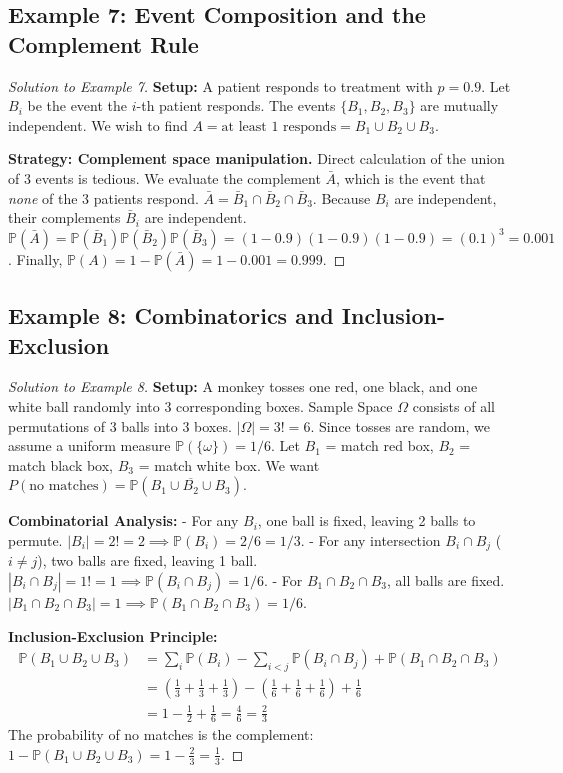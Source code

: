 \documentclass[12pt, a4paper]{article}
\theoremstyle{definition}
\theoremstyle{remark}
\newcommand{\Prob}{\mathbb{P}}
\newcommand{\W}{\Omega}
\newcommand{\1}{\mathbf{1}}
\begin{document}
\subsection*{Example 7: Event Composition and the Complement Rule}
\begin{proof}[Solution to Example 7]
\textbf{Setup:} A patient responds to treatment with $p=0.9$. Let $B_i$ be the event the $i$-th patient responds. The events $\{B_1, B_2, B_3\}$ are mutually independent. We wish to find $A = \text{at least 1 responds} = B_1 \cup B_2 \cup B_3$.

\textbf{Strategy: Complement space manipulation.} 
Direct calculation of the union of 3 events is tedious. We evaluate the complement $\bar{A}$, which is the event that \textit{none} of the 3 patients respond.
$\bar{A} = \bar{B}_1 \cap \bar{B}_2 \cap \bar{B}_3$.
Because $B_i$ are independent, their complements $\bar{B}_i$ are independent.
$\Prob(\bar{A}) = \Prob(\bar{B}_1)\Prob(\bar{B}_2)\Prob(\bar{B}_3) = (1-0.9)(1-0.9)(1-0.9) = (0.1)^3 = 0.001$.
Finally, $\Prob(A) = 1 - \Prob(\bar{A}) = 1 - 0.001 = 0.999$.
\end{proof}

\subsection*{Example 8: Combinatorics and Inclusion-Exclusion}
\begin{proof}[Solution to Example 8]
\textbf{Setup:} A monkey tosses one red, one black, and one white ball randomly into 3 corresponding boxes. 
Sample Space $\W$ consists of all permutations of 3 balls into 3 boxes. $|\W| = 3! = 6$. Since tosses are random, we assume a uniform measure $\Prob(\{\omega\}) = 1/6$.
Let $B_1$ = match red box, $B_2$ = match black box, $B_3$ = match white box.
We want $P(\text{no matches}) = \Prob(\overline{B_1 \cup B_2 \cup B_3})$.

\textbf{Combinatorial Analysis:}
- For any $B_i$, one ball is fixed, leaving 2 balls to permute. $|B_i| = 2! = 2 \implies \Prob(B_i) = 2/6 = 1/3$.
- For any intersection $B_i \cap B_j$ ($i \neq j$), two balls are fixed, leaving 1 ball. $|B_i \cap B_j| = 1! = 1 \implies \Prob(B_i \cap B_j) = 1/6$.
- For $B_1 \cap B_2 \cap B_3$, all balls are fixed. $|B_1 \cap B_2 \cap B_3| = 1 \implies \Prob(B_1 \cap B_2 \cap B_3) = 1/6$.

\textbf{Inclusion-Exclusion Principle:}
\begin{align*}
\Prob(B_1 \cup B_2 \cup B_3) &= \sum_{i} \Prob(B_i) - \sum_{i<j} \Prob(B_i \cap B_j) + \Prob(B_1 \cap B_2 \cap B_3) \\
&= \left(\frac{1}{3} + \frac{1}{3} + \frac{1}{3}\right) - \left(\frac{1}{6} + \frac{1}{6} + \frac{1}{6}\right) + \frac{1}{6} \\
&= 1 - \frac{1}{2} + \frac{1}{6} = \frac{4}{6} = \frac{2}{3}
\end{align*}
The probability of no matches is the complement: $1 - \Prob(B_1 \cup B_2 \cup B_3) = 1 - \frac{2}{3} = \frac{1}{3}$.
\end{proof}
\end{document}

